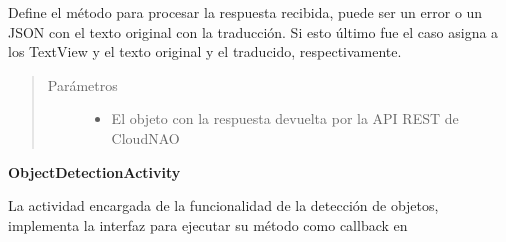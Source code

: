 \begin{fulllineitems}
\label{\detokenize{dev_docs:com.lar.cloudnao.OCRTranslationActivity.onVisionRequestCompleted(Object)}}
Define el método  
para procesar la respuesta recibida, puede ser un error o un JSON con el texto original con la traducción. Si esto último fue el caso asigna a los TextView 
{\hyperref[\detokenize{dev_docs:com.lar.cloudnao.OCRTranslationActivity.mSourceTextTV}]
{}} y 
{\hyperref[\detokenize{dev_docs:com.lar.cloudnao.OCRTranslationActivity.mTextTranslatedTV}]{}} el texto original y el 
traducido, respectivamente.
\begin{quote}\begin{description}
\item[{Parámetros}] \leavevmode\begin{itemize}
\item {} 
 \textendash{} El objeto con la respuesta devuelta por la API REST de CloudNAO

\end{itemize}

\end{description}\end{quote}

\end{fulllineitems}



\textbf{ObjectDetectionActivity}
\label{\detokenize{dev_docs:objectdetectionactivity}}

\begin{fulllineitems}
\label{\detokenize{dev_docs:com.lar.cloudnao.ObjectDetectionActivity}}
La actividad encargada de la funcionalidad de la detección de objetos, implementa la interfaz  para ejecutar su método  como callback en 

\end{fulllineitems}



